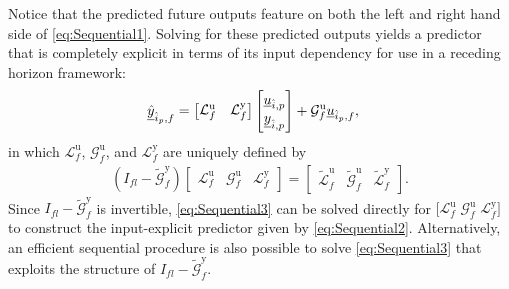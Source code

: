 Notice that the predicted future outputs feature on both the left and right hand side of \eqref{eq:Sequential1}. Solving for these predicted outputs yields a predictor that is completely explicit in terms of its input dependency for use in a receding horizon framework:
\begin{align}\label{eq:Sequential2}
    \underline{\hat{y}}_{\hat{i}_p,f} &=
    \begin{bmatrix}
        \mathcal{L}^\mathrm{u}_f & \mathcal{L}^\mathrm{y}_f 
    \end{bmatrix}    
    \begin{bmatrix}
        \underline{u}_{\hat{i},p}\\
        \underline{y}_{\hat{i},p}
    \end{bmatrix}+
    \mathcal{G}^\mathrm{u}_f
    \underline{u}_{\hat{i}_p,f},
\end{align}
in which $\mathcal{L}^\mathrm{u}_f$, $\mathcal{G}^\mathrm{u}_f$, and $\mathcal{L}^\mathrm{y}_f$ are uniquely defined by
\begin{align}\label{eq:Sequential3}
    \left(I_{fl}-\widetilde{\mathcal{G}}^\mathrm{y}_f\right)
    \begin{bmatrix}
        \mathcal{L}^\mathrm{u}_f & \mathcal{G}^\mathrm{u}_f & \mathcal{L}^\mathrm{y}_f
    \end{bmatrix}=
    \begin{bmatrix}
        \widetilde{\mathcal{L}}^\mathrm{u}_f & \widetilde{\mathcal{G}}^\mathrm{u}_f & \widetilde{\mathcal{L}}^\mathrm{y}_f
    \end{bmatrix}.
\end{align}
Since $I_{fl}-\widetilde{\mathcal{G}}^\mathrm{y}_f$ is invertible, \eqref{eq:Sequential3} can be solved directly for $\big[\mathcal{L}^\mathrm{u}_f \; \mathcal{G}^\mathrm{u}_f \; \mathcal{L}^\mathrm{y}_f\big]$ to construct the input-explicit predictor given by \eqref{eq:Sequential2}. Alternatively, an efficient sequential procedure is also possible to solve \eqref{eq:Sequential3} that exploits the structure of $I_{fl}-\widetilde{\mathcal{G}}^\mathrm{y}_f$.

